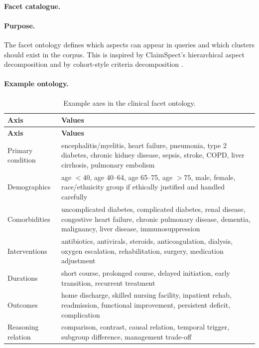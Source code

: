 \documentclass[11pt,a4paper]{article}
\begin{document}
\paragraph{Facet catalogue.}

\paragraph{Purpose.}
The facet ontology defines which aspects can appear in queries and which clusters should exist in the corpus. This is inspired by ClaimSpect's hierarchical aspect decomposition \citep{kargupta2025claimspect} and by cohort-style criteria decomposition \citep{ziletti2025cohorts}.

\paragraph{Example ontology.}

\begin{longtable}{p{3.5cm}p{11.5cm}}
	\caption{Example axes in the clinical facet ontology.}\\
	\toprule
	\textbf{Axis} & \textbf{Values}\\
	\midrule
	\endfirsthead
	\toprule
	\textbf{Axis} & \textbf{Values}\\
	\midrule
	\endhead
	\bottomrule
	\endfoot
	Primary condition & encephalitis/myelitis, heart failure, pneumonia, type 2 diabetes, chronic kidney disease, sepsis, stroke, COPD, liver cirrhosis, pulmonary embolism\\
	Demographics & age $<40$, age 40--64, age 65--75, age $>75$, male, female, race/ethnicity group if ethically justified and handled carefully\\
	Comorbidities & uncomplicated diabetes, complicated diabetes, renal disease, congestive heart failure, chronic pulmonary disease, dementia, malignancy, liver disease, immunosuppression\\
	Interventions & antibiotics, antivirals, steroids, anticoagulation, dialysis, oxygen escalation, rehabilitation, surgery, medication adjustment\\
	Durations & short course, prolonged course, delayed initiation, early transition, recurrent treatment\\
	Outcomes & home discharge, skilled nursing facility, inpatient rehab, readmission, functional improvement, persistent deficit, complication\\
	Reasoning relation & comparison, contrast, causal relation, temporal trigger, subgroup difference, management trade-off\\
\end{longtable}
\end{document}
